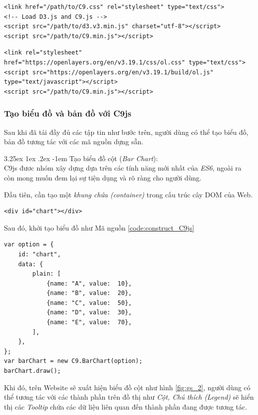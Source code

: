 \documentclass[12pt,a4paper,twoside]{article}
\makeatletter
\newcommand{\myparagraph}[1]{\paragraph{#1}\mbox{}\\} %
\renewcommand\paragraph{\@startsection{paragraph}{5}{\z@}%
  {3.25ex \@plus1ex \@minus.2ex}%
  {-1em}%
  {\normalfont\normalsize\bfseries}}
\makeatother
\begin{document}
\begin{lstlisting}[caption=Tải mã nguồn \textit{D3.js} trước tiên]
<link href="/path/to/C9.css" rel="stylesheet" type="text/css">
<!-- Load D3.js and C9.js -->
<script src="/path/to/d3.v3.min.js" charset="utf-8"></script>
<script src="/path/to/C9.min.js"></script>
\end{lstlisting}

\begin{lstlisting}[caption=Tải mã nguồn \textit{OpenLayers 3} nếu muốn sử dụng chức năng Bản đồ]
<link rel="stylesheet" href="https://openlayers.org/en/v3.19.1/css/ol.css" type="text/css">
<script src="https://openlayers.org/en/v3.19.1/build/ol.js" type="text/javascript"></script>
<script src="/path/to/C9.min.js"></script>
\end{lstlisting}

\subsubsection{Tạo biểu đồ và bản đồ với C9js}
Sau khi đã tải đầy đủ các tập tin như bước trên, người dùng có thể tạo biểu đồ, bản đồ tương tác với các mã nguồn dựng sẵn.

\myparagraph{Tạo biểu đồ cột (\textit{Bar Chart}):}
C9js đươc nhóm xây dựng dựa trên các tính năng mới nhất của \textit{ES6}, ngoài ra còn mong muốn đem lại sự tiện dụng và rõ ràng cho người dùng.

Đầu tiên, cần tạo một \textit{khung chứa (container)} trong cấu trúc cây DOM của Web.

\begin{lstlisting}[caption=Tạo \textit{container} để chứa biểu đồ]
<div id="chart"></div>
\end{lstlisting}

Sau đó, khởi tạo biểu đồ như Mã nguồn \ref{code:construct_C9js}

\begin{lstlisting}[caption=Khởi tạo biểu đồ với C9js,label={code:construct_C9js}]
var option = {
    id: "chart",
    data: {
        plain: [
            {name: "A", value:  10},
            {name: "B", value:  20},
            {name: "C", value:  50},
            {name: "D", value:  30},
            {name: "E", value:  70},
        ],
    }, 
};
var barChart = new C9.BarChart(option);
barChart.draw();
\end{lstlisting}

Khi đó, trên Website sẽ xuất hiện biểu đồ cột như hình \ref{fig:gs_2}, người dùng có thể tương tác với các thành phần trên đồ thị như \textit{Cột, Chú thích (Legend)} sẽ hiển thị các \textit{Tooltip} chứa các dữ liệu liên quan đến thành phần đang được tương tác.
\end{document}
